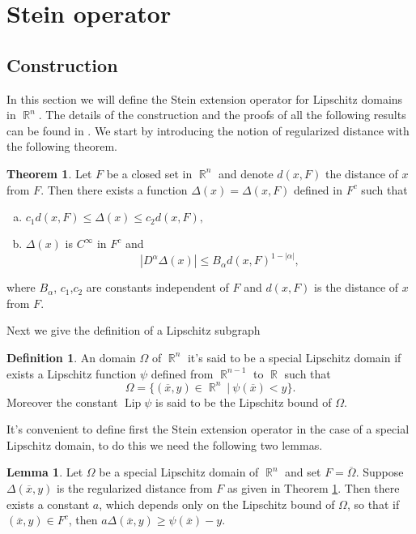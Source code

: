 \documentclass[12pt]{article}
\theoremstyle{definition}
\newtheorem{definition}{Definition}
\newtheorem{theorem}{Theorem}
\newtheorem{lemma}{Lemma}
\DeclareMathOperator\Lip{Lip}
\DeclareMathOperator\rr{\mathbb{R}}
\begin{document}
\section{Stein operator}

\subsection{Construction}
In this section we will define the Stein extension operator for Lipschitz domains in $\rr^n$. The details of the construction and the proofs of all the following results can be found in \cite[Section 2-3, Ch. VI]{stein}. We start by introducing the notion of regularized distance with the following theorem.

\begin{theorem}\label{regdist}
Let $F$ be a closed set in $\rr^n$ and denote $d(x,F)$ the distance of $x$ from $F$. Then there exists a function $\Delta(x)=\Delta(x,F)$ defined in $F^c$ such that
\begin{enumerate}[a)]
\item $c_1 d(x,F)\le \Delta(x)\le c_2d (x,F),$  
\item $\Delta(x)$ is $C^\infty$ in $F^c$ and
\[ \left | D^\alpha \Delta(x) \right | \le B_\alpha d(x,F)^{1-|\alpha|},\]
\end{enumerate}
where $B_\alpha$, $c_1$,$c_2$ are constants independent of $F$ and $d(x,F)$ is the distance of $x$ from $F.$
\end{theorem}
Next we give the definition of a Lipschitz subgraph 
\begin{definition}
An domain $\Omega$ of $\rr^n$ it's said to be a special Lipschitz domain if exists a Lipschitz function $\psi$ defined from $\rr^{n-1}$ to $\rr$ such that
\[ \Omega=\{(\overline x, y) \in \rr^n \ | \ \psi(\overline x)<y \}.\]
Moreover the constant $\Lip \psi$ is said to be the Lipschitz bound of $\Omega.$ 
\end{definition}
It's convenient to define first the Stein extension operator in the case of a special Lipschitz domain, to do this we need the following two lemmas.
\begin{lemma}\label{lemma1}
Let $\Omega$ be a special Lipschitz domain of $\rr^n$ and set $F=\overline \Omega$. Suppose $\Delta(\overline x, y)$ is the regularized distance from $F$ as given in Theorem \ref{regdist}. Then there exists a constant $a$, which depends only on the Lipschitz bound of $\Omega$, so that if $(\overline x, y) \in F^c$, then $a\Delta(\overline x,y)\ge \psi(\overline x)- y.$
\end{lemma}
\end{document}
